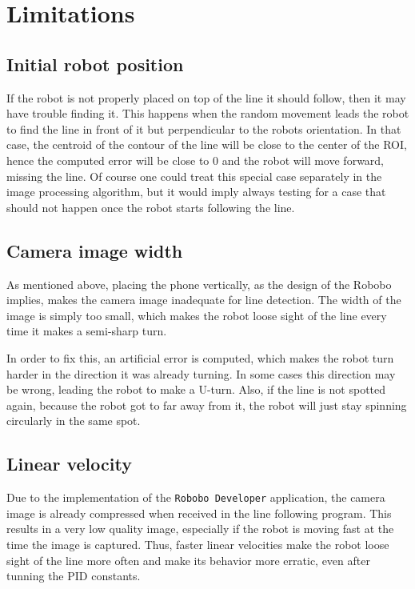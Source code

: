 \documentclass[10pt,conference,compsoc]{IEEEtran}
\begin{document}
\section{Limitations}

\subsection{Initial robot position}

If the robot is not properly placed on top of the line it should follow, then it may have trouble finding it. This happens when the random movement leads the robot to find the line in front of it but perpendicular to the robots orientation. In that case, the centroid of the contour of the line will be close to the center of the ROI, hence the computed error will be close to 0 and the robot will move forward, missing the line. Of course one could treat this special case separately in the image processing algorithm, but it would imply always testing for a case that should not happen once the robot starts following the line.

\subsection{Camera image width}

As mentioned above, placing the phone vertically, as the design of the Robobo implies, makes the camera image inadequate for line detection. The width of the image is simply too small, which makes the robot loose sight of the line every time it makes a semi-sharp turn.

In order to fix this, an artificial error is computed, which makes the robot turn harder in the direction it was already turning. In some cases this direction may be wrong, leading the robot to make a U-turn. Also, if the line is not spotted again, because the robot got to far away from it, the robot will just stay spinning circularly in the same spot.

\subsection{Linear velocity}

Due to the implementation of the \texttt{Robobo Developer} application, the camera image is already compressed when received in the line following program. This results in a very low quality image, especially if the robot is moving fast at the time the image is captured. Thus, faster linear velocities make the robot loose sight of the line more often and make its behavior more erratic, even after tunning the PID constants.
\end{document}
